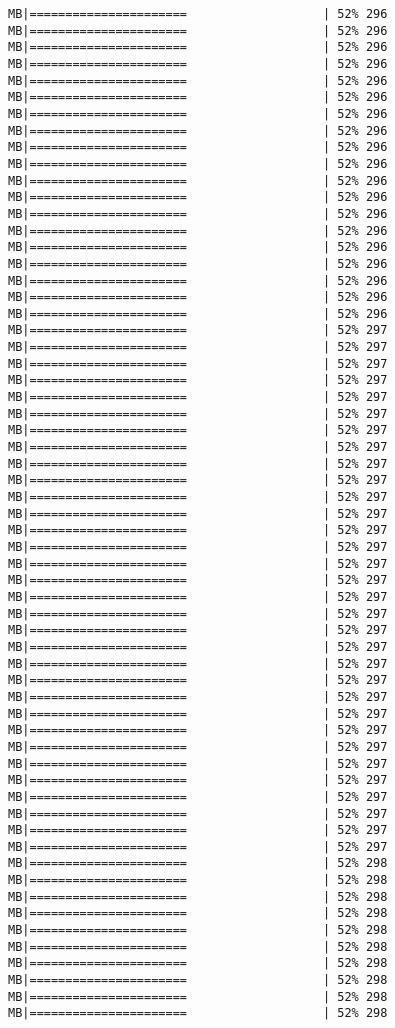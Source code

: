 \documentclass[
]{article}
\begin{document}
\begin{verbatim}
MB|======================                   | 52% 296 MB|======================                   | 52% 296 MB|======================                   | 52% 296 MB|======================                   | 52% 296 MB|======================                   | 52% 296 MB|======================                   | 52% 296 MB|======================                   | 52% 296 MB|======================                   | 52% 296 MB|======================                   | 52% 296 MB|======================                   | 52% 296 MB|======================                   | 52% 296 MB|======================                   | 52% 296 MB|======================                   | 52% 296 MB|======================                   | 52% 296 MB|======================                   | 52% 296 MB|======================                   | 52% 296 MB|======================                   | 52% 296 MB|======================                   | 52% 296 MB|======================                   | 52% 296 MB|======================                   | 52% 297 MB|======================                   | 52% 297 MB|======================                   | 52% 297 MB|======================                   | 52% 297 MB|======================                   | 52% 297 MB|======================                   | 52% 297 MB|======================                   | 52% 297 MB|======================                   | 52% 297 MB|======================                   | 52% 297 MB|======================                   | 52% 297 MB|======================                   | 52% 297 MB|======================                   | 52% 297 MB|======================                   | 52% 297 MB|======================                   | 52% 297 MB|======================                   | 52% 297 MB|======================                   | 52% 297 MB|======================                   | 52% 297 MB|======================                   | 52% 297 MB|======================                   | 52% 297 MB|======================                   | 52% 297 MB|======================                   | 52% 297 MB|======================                   | 52% 297 MB|======================                   | 52% 297 MB|======================                   | 52% 297 MB|======================                   | 52% 297 MB|======================                   | 52% 297 MB|======================                   | 52% 297 MB|======================                   | 52% 297 MB|======================                   | 52% 297 MB|======================                   | 52% 297 MB|======================                   | 52% 297 MB|======================                   | 52% 297 MB|======================                   | 52% 298 MB|======================                   | 52% 298 MB|======================                   | 52% 298 MB|======================                   | 52% 298 MB|======================                   | 52% 298 MB|======================                   | 52% 298 MB|======================                   | 52% 298 MB|======================                   | 52% 298 MB|======================                   | 52% 298 MB|======================                   | 52% 298 
\end{verbatim}
\end{document}
